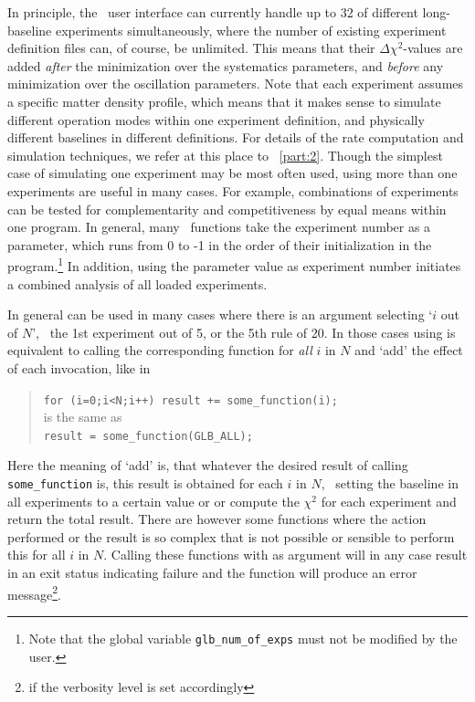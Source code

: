 In principle, the \GLOBES\ user interface can currently handle up to 32 of different long-baseline experiments simultaneously, where the number
of existing experiment definition files can, of course, be unlimited. This means that their $\Delta \chi^2$-values are added {\em after} the minimization over the systematics parameters, and {\em before} any minimization over the oscillation parameters. Note that each experiment
assumes a specific matter density profile, which means
that it makes sense to simulate different operation modes within one
experiment definition, and physically different baselines in different
definitions. For details of the rate computation and
simulation techniques, we refer at this place to \Part~\ref{part:2}. Though
 the simplest case of simulating one experiment may be most often used, 
 using more than one experiments are useful in many cases. For example, combinations of experiments can be tested for
complementarity and competitiveness by equal means within one program.
In general, many \GLOBES\ functions take the experiment number as
a parameter, which runs from $0$ to -1 in the order of their initialization in the program.\footnote{Note that
the global variable {\tt glb\_num\_of\_exps} must not be modified by the
user.} In addition, using the parameter value  as
experiment number initiates a combined analysis of all loaded experiments.

In general  can be used in many cases where there is an argument
selecting `$i$ out of $N$', \eg\ the 1st experiment out of 5, or the 5th
rule of 20. In those cases  using  is equivalent to
calling the corresponding function for \emph{all} $i$ in $N$  and `add' 
the effect of each
invocation, like in
\begin{quote}
\verb&for (i=0;i<N;i++) result += some_function(i);&\\
is the same as\\
\verb&result = some_function(GLB_ALL);&
\end{quote}
Here the meaning of `add' is, that whatever the desired result of calling
\verb+some_function+ is, this result is obtained for each $i$ in $N$, \eg\ 
setting the baseline in all experiments to a certain value or
or compute the $\chi^2$ for each experiment and return the total result.
There are however some functions where the action performed or the result
is so complex that is not possible or sensible to perform this for all $i$
in $N$. Calling these functions with  \GLBC{GLB\_ALL} as argument will 
in any case result in an exit status indicating
failure and the function will produce an 
error message\footnote{if the verbosity
level is set accordingly}.


